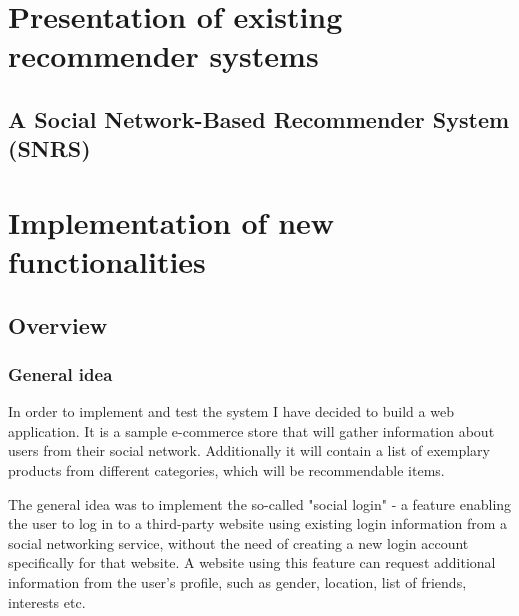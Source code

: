 \documentclass[12pt]{report}
\begin{document}



\chapter{Presentation of existing recommender systems}

\section{A Social Network-Based Recommender System (SNRS)}


\chapter{Implementation of new functionalities}

\section{Overview}
\subsection{General idea}
In order to implement and test the system I have decided to build a web application. It is a sample e-commerce store that will gather information about users from their social network. Additionally it will contain a list of exemplary products from different categories, which will be recommendable items. 

The general idea was to implement the so-called "social login" - \cite{social_login} a feature enabling the user to log in to a third-party website using existing login information from a social networking service, without the need of creating a new login account specifically for that website. A website using this feature can request additional information from the user's profile, such as gender, location, list of friends, interests etc. 
\end{document}
